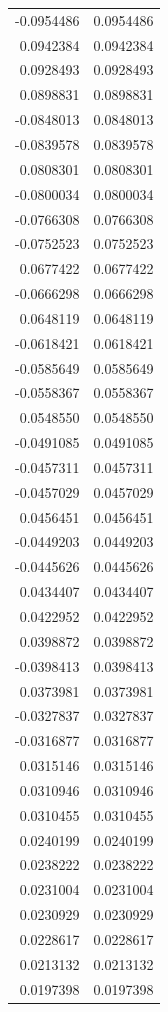 \documentclass[
]{article}
\begin{document}
\begin{longtable}[]{@{}rr@{}}
-0.0954486 & 0.0954486 \\
0.0942384 & 0.0942384 \\
0.0928493 & 0.0928493 \\
0.0898831 & 0.0898831 \\
-0.0848013 & 0.0848013 \\
-0.0839578 & 0.0839578 \\
0.0808301 & 0.0808301 \\
-0.0800034 & 0.0800034 \\
-0.0766308 & 0.0766308 \\
-0.0752523 & 0.0752523 \\
0.0677422 & 0.0677422 \\
-0.0666298 & 0.0666298 \\
0.0648119 & 0.0648119 \\
-0.0618421 & 0.0618421 \\
-0.0585649 & 0.0585649 \\
-0.0558367 & 0.0558367 \\
0.0548550 & 0.0548550 \\
-0.0491085 & 0.0491085 \\
-0.0457311 & 0.0457311 \\
-0.0457029 & 0.0457029 \\
0.0456451 & 0.0456451 \\
-0.0449203 & 0.0449203 \\
-0.0445626 & 0.0445626 \\
0.0434407 & 0.0434407 \\
0.0422952 & 0.0422952 \\
0.0398872 & 0.0398872 \\
-0.0398413 & 0.0398413 \\
0.0373981 & 0.0373981 \\
-0.0327837 & 0.0327837 \\
-0.0316877 & 0.0316877 \\
0.0315146 & 0.0315146 \\
0.0310946 & 0.0310946 \\
0.0310455 & 0.0310455 \\
0.0240199 & 0.0240199 \\
0.0238222 & 0.0238222 \\
0.0231004 & 0.0231004 \\
0.0230929 & 0.0230929 \\
0.0228617 & 0.0228617 \\
0.0213132 & 0.0213132 \\
0.0197398 & 0.0197398 \\

\end{longtable}
\end{document}
